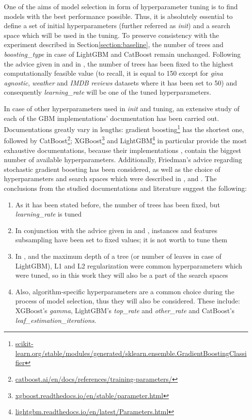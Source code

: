 \documentclass[magisterska, english]{pwr_wmat_praca_dyplomowa}
\theoremstyle{plain}
\numberwithin{theorem}{chapter}
\theoremstyle{definition}
\numberwithin{theorem}{chapter}
\begin{document}
One of the aims of model selection in form of hyperparameter tuning is to find models with the best performance possible. Thus, it is absolutely essential to define a set of initial hyperparameters (further referred as \emph{init}) and a search space which will be used in the tuning. To preserve consistency with the experiment described in Section\ref{section:baseline}, the number of trees and \emph{boosting\_type} in case of LightGBM and CatBoost remain unchanged. Following the advice given in \cite{comparative_analysis} and in \cite{friedman_gbm}, the number of trees has been fixed to the highest computationally feasible value (to recall, it is equal to 150 except for \emph{gina agnostic}, \emph{weather} and \emph{IMDB reviews} datasets where it has been set to 50) and consequently \emph{learning\_rate} will be one of the tuned hyperparameters.

In case of other hyperparameters used in \emph{init} and tuning, an extensive study of each of the GBM implementations' documentation has been carried out. Documentations greatly vary in lengths: gradient boosting\footnote{\url{scikit-learn.org/stable/modules/generated/sklearn.ensemble.GradientBoostingClassifier}} has the shortest one, followed by CatBoost\footnote{\url{catboost.ai/en/docs/references/training-parameters/}}; XGBoost\footnote{\url{xgboost.readthedocs.io/en/stable/parameter.html}} and LightGBM\footnote{\url{lightgbm.readthedocs.io/en/latest/Parameters.html}} in particular provide the most exhaustive documentations, because their implementations \cite{xgboost}, \cite{lightgbm} contain the biggest number of available hyperparameters. Additionally, Friedman's advice regarding stochastic gradient boosting \cite{friedman_stoch} has been considered, as well as the choice of hyperparameters and search spaces which were described in \cite{catboost}, \cite{comparative_analysis} and \cite{competitive_analysis}. The conclusions from the studied documentations and literature suggest the following:
\begin{enumerate}
    \item As it has been stated before, the number of trees has been fixed, but \emph{learning\_rate} is tuned
    \item In conjunction with the advice given in \cite{friedman_stoch} and \cite{comparative_analysis}, instances and features subsampling have been set to fixed values; it is not worth to tune them
    \item In \cite{catboost}, \cite{comparative_analysis} and \cite{competitive_analysis} the maximum depth of a tree (or number of leaves in case of LightGBM), L1 and L2 regularization were common hyperparameters which were tuned, so in this work they will also be a part of the search spaces
    \item Also, algorithm-specific hyperparameters are a common choice during the process of model selection, thus they will also be considered. These include: XGBoost's \emph{gamma}, LightGBM's \emph{top\_rate} and \emph{other\_rate} and CatBoost's \emph{leaf\_estimation\_iterations}. 
\end{enumerate}
\end{document}
